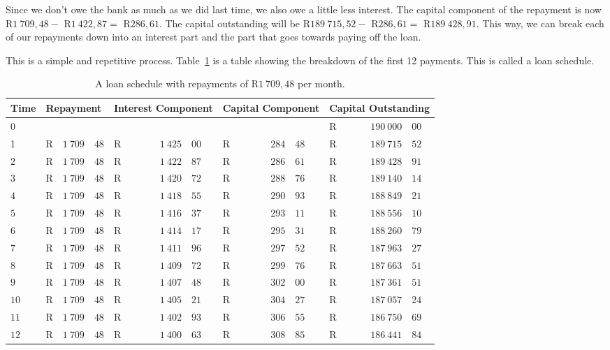 Since we don't owe the bank as much as we did last time, we also owe a little less interest. The capital component of the repayment is now R$1~709,48 -$ R$1~422,87 =$ R$286,61$. The capital outstanding will be R$189~715,52 -$ R$286,61 =$ R$189~428,91$. This way, we can break each of our repayments down into an interest part and the part that goes towards paying off the loan.

This is a simple and repetitive process. Table~\ref{tb:lschedule1} is a table showing the breakdown of the first 12 payments. This is called a loan schedule.

\begin{table}
\begin{center}
\begin{tabular}{|l|lr@{,}l|lr@{,}l|lr@{,}l|lr@{,}l|}
\hline
Time&\multicolumn{3}{l|}{Repayment}&\multicolumn{3}{p{2cm}|}{Interest Component}&\multicolumn{3}{p{2cm}|}{Capital Component}&\multicolumn{3}{p{2.5cm}|}{Capital Outstanding}\\
\hline
\hline
$0$&\multicolumn{3}{l|}{}&\multicolumn{3}{r|}{}&\multicolumn{3}{r|}{}&R&$190~000$&$00$\\
1&R&$1~709$&$48$&R&$1~425$&$00$&R&$284$&$48$&R&$189~715$&$52$\\
$2$&R&$1~709$&$48$&R&$1~422$&$87$&R&$286$&$61$&R&$189~428$&$91$\\
$3$&R&$1~709$&$48$&R&$1~420$&$72$&R&$288$&$76$&R&$189~140$&$14$\\
$4$&R&$1~709$&$48$&R&$1~418$&$55$&R&$290$&$93$&R&$188~849$&$21$\\
$5$&R&$1~709$&$48$&R&$1~416$&$37$&R&$293$&$11$&R&$188~556$&$10$\\
$6$&R&$1~709$&$48$&R&$1~414$&$17$&R&$295$&$31$&R&$188~260$&$79$\\
$7$&R&$1~709$&$48$&R&$1~411$&$96$&R&$297$&$52$&R&$187~963$&$27$\\
$8$&R&$1~709$&$48$&R&$1~409$&$72$&R&$299$&$76$&R&$187~663$&$51$\\
$9$&R&$1~709$&$48$&R&$1~407$&$48$&R&$302$&$00$&R&$187~361$&$51$\\
$10$&R&$1~709$&$48$&R&$1~405$&$21$&R&$304$&$27$&R&$187~057$&$24$\\
$11$&R&$1~709$&$48$&R&$1~402$&$93$&R&$306$&$55$&R&$186~750$&$69$\\
$12$&R&$1~709$&$48$&R&$1~400$&$63$&R&$308$&$85$&R&$186~441$&$84$\\

\hline
\end{tabular}
\end{center}
\caption{A loan schedule with repayments of R$1~709,48$ per month.}
\label{tb:lschedule1}
\end{table}

